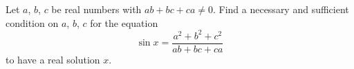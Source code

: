 Let $a$, $b$, $c$ be real numbers with $ab+bc+ca\ne0$. Find a necessary and sufficient condition on $a$, $b$, $c$ for the equation
\[
\sin x=\dfrac{a^2+b^2+c^2}{ab+bc+ca}
\]
to have a real solution $x$.
